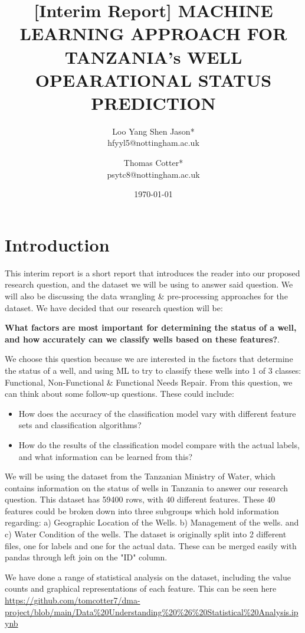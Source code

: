 \documentclass{article}
\title{[Interim Report] MACHINE LEARNING APPROACH FOR TANZANIA's WELL OPEARATIONAL STATUS PREDICTION }
\author{Loo Yang Shen Jason*\\
        hfyyl5@nottingham.ac.uk \and Thomas Cotter*\\
        psytc8@nottingham.ac.uk}
\date{\today}
\begin{document}
    
\maketitle

\section{Introduction}
\label{sec:intro}
This interim report is a short report that introduces the reader into our proposed research question, and the dataset we will be using to answer said question. We will also be discussing the data wrangling \& pre-processing approaches for the dataset. We have decided that our research question will be: 

\textbf{What factors are most important for determining the status of a well, and how accurately can we classify wells based on these features?}. 

We choose this question because we are interested in the factors that determine the status of a well, and using ML to try to classify these wells into 1 of 3 classes: Functional, Non-Functional \& Functional Needs Repair. From this question, we can think about some follow-up questions. These could include:
    \begin{itemize}
        \item How does the accuracy of the classification model vary with different feature sets and classification algorithms?
        \item How do the results of the classification model compare with the actual labels, and what information can be learned from this?
    \end{itemize}
 

We will be using the dataset from the Tanzanian Ministry of Water, which contains information on the status of wells in Tanzania to answer our research question. This dataset has 59400 rows, with 40 different features. These 40 features could be broken down into three subgroups which hold information regarding: a) Geographic Location of the Wells. b) Management of the wells. and c) Water Condition of the wells. The dataset is originally split into 2 different files, one for labels and one for the actual data. These can be merged easily with pandas through left join on the "ID" column. 

We have done a range of statistical analysis on the dataset, including the value counts and graphical representations of each feature. This can be seen here \url{https://github.com/tomcotter7/dma-project/blob/main/Data\%20Understanding\%20\%26\%20Statistical\%20Analysis.ipynb}
\end{document}
